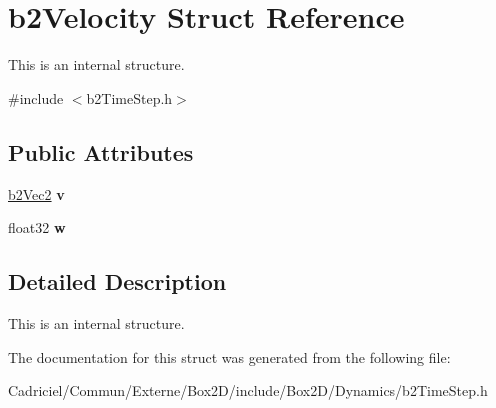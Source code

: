 \hypertarget{structb2_velocity}{}\section{b2\+Velocity Struct Reference}
\label{structb2_velocity}


This is an internal structure.  




{\ttfamily \#include $<$b2\+Time\+Step.\+h$>$}

\subsection*{Public Attributes}
\begin{DoxyCompactItemize}
\item 
\hyperlink{structb2_vec2}{b2\+Vec2} {\bfseries v}\hypertarget{structb2_velocity_a73b92ceff532491e71b9dbc53eecaa70}{}\label{structb2_velocity_a73b92ceff532491e71b9dbc53eecaa70}

\item 
float32 {\bfseries w}\hypertarget{structb2_velocity_a6ce6f6c83ceb95100532d3f2b0485b83}{}\label{structb2_velocity_a6ce6f6c83ceb95100532d3f2b0485b83}

\end{DoxyCompactItemize}


\subsection{Detailed Description}
This is an internal structure. 

The documentation for this struct was generated from the following file\+:\begin{DoxyCompactItemize}
\item 
Cadriciel/\+Commun/\+Externe/\+Box2\+D/include/\+Box2\+D/\+Dynamics/b2\+Time\+Step.\+h\end{DoxyCompactItemize}

